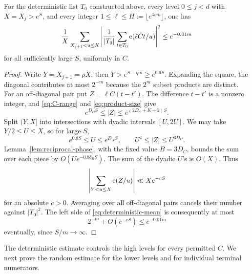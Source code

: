 \begin{lemma}\label{lem:deterministic}
For the deterministic list \(T_0\) constructed above, every level
\(0\le j<d\) with \(X=X_j>e^S\), and every integer
\(1\le\ell\le H:=\lfloor e^{4\eta m}\rfloor\), one has
\begin{equation}\label{eq:deterministic-mean}
 \frac1X\sum_{X_{j+1}<u\le X}
 \left|\frac1{|T_0|}\sum_{t\in T_0}\mathrm e(\ell Ct/u)\right|^2
 \le e^{-0.01m}
\end{equation}
for all sufficiently large \(S\), uniformly in \(C\).
\end{lemma}
\begin{proof}
Write \(Y=X_{j+1}=\rho X\); then
\(Y>e^{S-\eta m}\ge e^{0.9S}\).
Expanding the square, the diagonal contributes at most \(2^{-m}\)
because the \(2^m\) subset products are distinct.
For an off-diagonal pair put \(Z=\ell C(t-t')\).
The difference \(t-t'\) is a nonzero integer, and
\eqref{eq:C-range} and \eqref{eq:product-size} give
\[
 e^{D_CS}\le |Z|\le e^{(2D_C+K+2)S}.
\]
Split \((Y,X]\) into intersections with dyadic intervals \([U,2U]\).
We may take \(Y/2\le U\le X\), so for large \(S\),
\[
 e^{0.8S}\le U\le e^{D_XS},\qquad
 U^4\le |Z|\le U^{3D_C}.
\]
Lemma~\ref{lem:reciprocal-phase}, with the fixed value \(B=3D_C\),
bounds the sum over each piece by
\(O(Ue^{-0.8\delta_BS})\).
The sum of the dyadic \(U\)'s is \(O(X)\).  Thus
\[
 \left|\sum_{Y<u\le X}\mathrm e(Z/u)\right|\ll Xe^{-cS}
\]
for an absolute \(c>0\).  Averaging over all off-diagonal pairs
cancels their number against \(|T_0|^2\).  The left side of
\eqref{eq:deterministic-mean} is consequently at most
\[
 2^{-m}+O(e^{-cS})\le e^{-0.01m}
\]
eventually, since \(S/m\to\infty\).
\end{proof}

The deterministic estimate controls the high levels for every
permitted \(C\).  We next prove the random estimate for the lower
levels and for individual terminal numerators.


